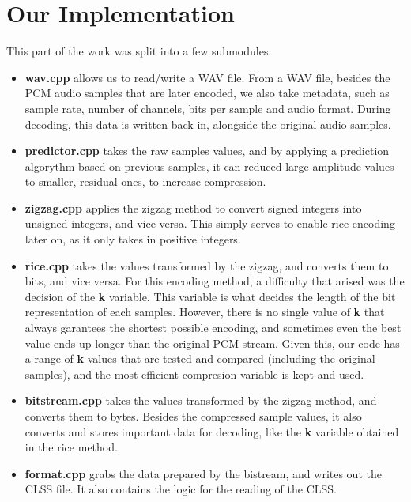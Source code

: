 \begin{table}[htbp]
\begin{tabularx}{\textwidth}{
        @{}
        >{\raggedright\arraybackslash}p{}
        >{\raggedright\arraybackslash}X
        >{\raggedright\arraybackslash}X
        @{}
    }
        \bottomrule
    \end{tabularx}

    \vspace{2mm}
    \small
\end{table}

\vspace{10pt}
\section{Our Implementation}

This part of the work was split into a few submodules:

\begin{itemize}
    \item \textbf{wav.cpp} allows us to read/write a WAV file. From a WAV file, besides the PCM audio samples that are later encoded, we also take metadata, such as sample rate, number of channels, bits per sample and audio format. During decoding, this data is written back in, alongside the original audio samples.
    
    \item \textbf{predictor.cpp} takes the raw samples values, and by applying a prediction algorythm based on previous samples, it can reduced large amplitude values to smaller, residual ones, to increase compression.
     
    \item \textbf{zigzag.cpp} applies the zigzag method to convert signed integers into unsigned integers, and vice versa. This simply serves to enable rice encoding later on, as it only takes in positive integers.
    
    \item \textbf{rice.cpp} takes the values transformed by the zigzag, and converts them to bits, and vice versa. For this encoding method, a difficulty that arised was the decision of the \textbf{k} variable. This variable is what decides the length of the bit representation of each samples. However, there is no single value of \textbf{k} that always garantees the shortest possible encoding, and sometimes even the best value ends up longer than the original PCM stream. Given this, our code has a range of \textbf{k} values that are tested and compared (including the original samples), and the most efficient compresion variable is kept and used.

    \item \textbf{bitstream.cpp} takes the values transformed by the zigzag method, and converts them to bytes. Besides the compressed sample values, it also converts and stores important data for decoding, like the \textbf{k} variable obtained in the rice method.
    
    \item \textbf{format.cpp} grabs the data prepared by the bistream, and writes out the CLSS file. It also contains the logic for the reading of the CLSS.
\end{itemize}


